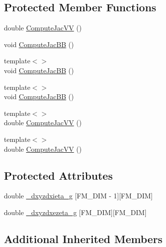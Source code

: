 \subsection*{Protected Member Functions}
\begin{DoxyCompactItemize}
\item 
double \mbox{\hyperlink{classfemus_1_1_current_gauss_point_aa169b843fa89bc565b0757cc57b0e4d7}{Compute\+Jac\+VV}} ()
\item 
void \mbox{\hyperlink{classfemus_1_1_current_gauss_point_a13a36ea2f7ec52b2ed4186c0940755aa}{Compute\+Jac\+BB}} ()
\item 
{\footnotesize template$<$$>$ }\\void \mbox{\hyperlink{classfemus_1_1_current_gauss_point_a67ace006341ad08aad318cee34bf68ed}{Compute\+Jac\+BB}} ()
\item 
{\footnotesize template$<$$>$ }\\void \mbox{\hyperlink{classfemus_1_1_current_gauss_point_af66b9ef7607c4b0f3046ded08c15ab54}{Compute\+Jac\+BB}} ()
\item 
{\footnotesize template$<$$>$ }\\double \mbox{\hyperlink{classfemus_1_1_current_gauss_point_a76637d593d498d6abc7bd3190303d2fc}{Compute\+Jac\+VV}} ()
\item 
{\footnotesize template$<$$>$ }\\double \mbox{\hyperlink{classfemus_1_1_current_gauss_point_a3188289d2e70cc6ada264171132be163}{Compute\+Jac\+VV}} ()
\end{DoxyCompactItemize}
\subsection*{Protected Attributes}
\begin{DoxyCompactItemize}
\item 
double \mbox{\hyperlink{classfemus_1_1_current_gauss_point_aa7c40a89d85a264566e495f775ed0977}{\+\_\+dxyzdxieta\+\_\+g}} \mbox{[}F\+M\+\_\+\+D\+IM -\/ 1\mbox{]}\mbox{[}F\+M\+\_\+\+D\+IM\mbox{]}
\item 
double \mbox{\hyperlink{classfemus_1_1_current_gauss_point_ab108c2df3569ff9b84311043add21244}{\+\_\+dxyzdxezeta\+\_\+g}} \mbox{[}F\+M\+\_\+\+D\+IM\mbox{]}\mbox{[}F\+M\+\_\+\+D\+IM\mbox{]}
\end{DoxyCompactItemize}
\subsection*{Additional Inherited Members}


